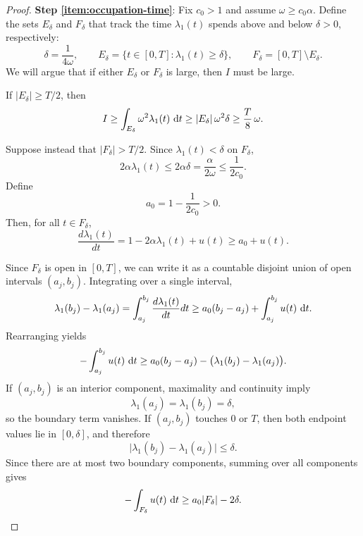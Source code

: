 \begin{proof}
\textbf{Step \ref{item:occupation-time}}:
Fix $c_0>1$ and assume $\omega \geq c_0\alpha$. 
Define the sets $E_{\delta}$ and $F_{\delta}$ that track the time $\lambda_1(t)$ spends above and below $\delta > 0$, respectively:
\begin{equation*}
    \delta = \frac{1}{4\omega},
    \qquad
    E_\delta = \{t \in [0, T] : \lambda_1(t)\geq \delta\},
    \qquad
    F_\delta = [0,T]\setminus E_\delta.
\end{equation*}
We will argue that if either $E_{\delta}$ or $F_{\delta}$ is large, then $I$ must be large.

If $|E_\delta|\geq T/2$, then
\begin{equation*}
    I
    \geq
    \int_{E_\delta}\omega^2\lambda_1(t)\,\mathop{}\!\mathrm{d} t
    \geq
    |E_\delta|\,\omega^2\delta
    \geq
    \frac{T}{8}\,\omega.
\end{equation*}

Suppose instead that $|F_\delta|> T/2$. 
Since $\lambda_1(t)<\delta$ on $F_{\delta}$, 
\begin{equation*}
    2\alpha\lambda_1(t)
    \leq
    2\alpha\delta
    =
    \frac{\alpha}{2\omega}
    \leq
    \frac{1}{2c_0}.
\end{equation*}
Define
\begin{equation*}
    a_0 = 1-\frac{1}{2c_0} > 0.
\end{equation*}
Then, for all $t\in F_\delta$,
\begin{equation*}
    \frac{d\lambda_1(t)}{dt}=1-2\alpha\lambda_1(t)+u(t)\geq a_0 + u(t).
\end{equation*}

Since $F_\delta$ is open in $[0, T]$, we can write it as a countable disjoint union of open intervals $(a_j, b_j)$.
Integrating over a single interval,
\begin{equation*}
    \lambda_1(b_j) -\lambda_1(a_j)
    =
    \int_{a_j}^{b_j}\frac{d \lambda_1(t)}{dt} dt
    \geq
    a_0(b_j-a_j)
    +
    \int_{a_j}^{b_j}u(t)\,\mathop{}\!\mathrm{d} t.
\end{equation*}
Rearranging yields
\begin{equation*}
    -\int_{a_j}^{b_j}u(t)\,\mathop{}\!\mathrm{d} t
    \geq
    a_0(b_j-a_j)
    -
    \big(\lambda_1(b_j)-\lambda_1(a_j)\big).
\end{equation*}
If $(a_j,b_j)$ is an interior component, maximality and continuity imply
\begin{equation*}
    \lambda_1(a_j)=\lambda_1(b_j)=\delta,
\end{equation*}
so the boundary term vanishes. If $(a_j,b_j)$ touches $0$ or $T$, then both endpoint values lie in $[0, \delta]$, and therefore
\begin{equation*}
    \big|\lambda_1(b_j)-\lambda_1(a_j)\big| \leq \delta.
\end{equation*}
Since there are at most two boundary components, summing over all components gives
\begin{equation*}
    -\int_{F_\delta}u(t)\,\mathop{}\!\mathrm{d} t
    \geq
    a_0 |F_\delta| - 2\delta.
\end{equation*}


\end{proof}
